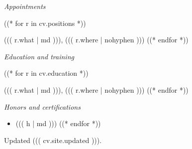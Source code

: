 \documentclass[10pt,letterpaper]{article}
\newlength{\gutter}\setlength{\gutter}{2.4cm}
\newcommand{\cvsection}[1]{%
  \par\addvspace{1.1em}%
  {\Large\itshape #1\par}\nopagebreak\vspace{0.4em}}
\newenvironment{dated}{%
  \list{}{%
    \setlength{\leftmargin}{0pt}%
    \setlength{\labelwidth}{\gutter}%
    \setlength{\labelsep}{0pt}%
    \setlength{\itemindent}{0pt}%
    \setlength{\topsep}{0pt}%
    \setlength{\partopsep}{0pt}%
    \setlength{\parsep}{0pt}%
    \setlength{\itemsep}{0.55em}%
    \renewcommand{\makelabel}[1]{\hfill{\color{muted}##1}\hspace{1em}}}}%
  {\endlist}
\begin{document}
\cvsection{Appointments}
\begin{dated}
((* for r in cv.positions *))
\item[((( r.when )))] ((( r.what | md ))), {\color{muted}((( r.where | nohyphen )))}
((* endfor *))
\end{dated}

\cvsection{Education and training}
\begin{dated}
((* for r in cv.education *))
\item[((( r.when )))] ((( r.what | md ))), {\color{muted}((( r.where | nohyphen )))}
((* endfor *))
\end{dated}

\cvsection{Honors and certifications}
\begin{itemize}
  \setlength{\itemsep}{0.2em}\setlength{\parsep}{0pt}
((* for h in cv.honors *))
  \item ((( h | md )))
((* endfor *))
\end{itemize}

\vspace{2em}
{\small\color{muted}Updated ((( cv.site.updated ))).}
\end{document}
